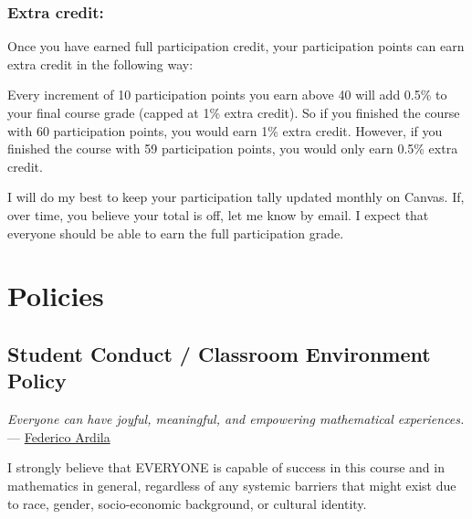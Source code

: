 \documentclass[11pt]{article}
\begin{document}
\subsubsection*{Extra credit:} 

Once you have earned full participation credit, your participation points can earn extra credit in the following way:

Every increment of 10 participation points you earn above 40 will add 0.5\% to your final course grade (capped at 1\% extra credit).  So if you finished the course with 60 participation points, you would earn 1\% extra credit.  However, if you finished the course with 59 participation points, you would only earn 0.5\% extra credit.

I will do my best to keep your participation tally updated monthly on Canvas. If, over time, you believe
your total is off, let me know by email. I expect that everyone should be able to earn the full participation grade.


\section{Policies}

\subsection{Student Conduct / Classroom Environment Policy}

\begin{center}
    \textit{Everyone can have joyful, meaningful, and empowering mathematical experiences.} --- \href{http://fardila.com/}{Federico Ardila}
\end{center}

I strongly believe that EVERYONE is capable of success in this course and in mathematics in general, regardless of any systemic barriers that might exist due to race, gender, socio-economic background, or cultural identity. 
\end{document}
